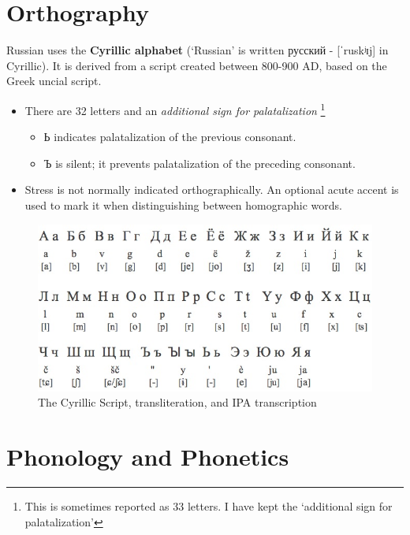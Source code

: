 \documentclass[
  a4paperpaper,
]{report}
\providecommand{\tightlist}{%
  \setlength{\itemsep}{0pt}\setlength{\parskip}{0pt}}
\begin{document}
\hypertarget{orthography}{%
\chapter{Orthography}\label{orthography}}

Russian uses the \textbf{Cyrillic alphabet} (`Russian' is written
русский - {[}ˈruskʲɪj{]} in Cyrillic). It is derived from a script
created between 800-900 AD, based on the Greek uncial script.

\begin{itemize}
\tightlist
\item
  There are 32 letters and an \emph{additional sign for palatalization}
  \footnote{This is sometimes reported as 33 letters. I have kept the
    `additional sign for palatalization'}

  \begin{itemize}
  \tightlist
  \item
    Ь indicates palatalization of the previous consonant.
  \item
    Ъ is silent; it prevents palatalization of the preceding consonant.
  \end{itemize}
\item
  Stress is not normally indicated orthographically. An optional acute
  accent is used to mark it when distinguishing between homographic
  words.
\end{itemize}

\begin{figure}
\centering
\includegraphics{./script.jpg}
\caption{The Cyrillic Script, transliteration, and IPA transcription}
\end{figure}

\hypertarget{phonology-and-phonetics}{%
\chapter{Phonology and Phonetics}\label{phonology-and-phonetics}}
\end{document}
